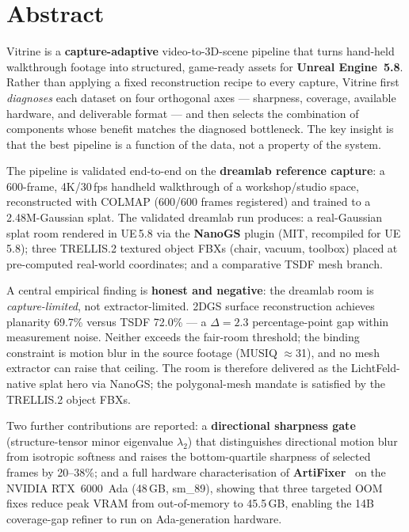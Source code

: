 \documentclass[a4paper,11pt]{report}
\begin{document}

\chapter*{Abstract}

Vitrine is a \textbf{capture-adaptive} video-to-3D-scene pipeline that turns
hand-held walkthrough footage into structured, game-ready assets for
\textbf{Unreal Engine~5.8}.  Rather than applying a fixed reconstruction recipe
to every capture, Vitrine first \emph{diagnoses} each dataset on four
orthogonal axes --- sharpness, coverage, available hardware, and deliverable
format --- and then selects the combination of components whose benefit matches
the diagnosed bottleneck.  The key insight is that the best pipeline is a
function of the data, not a property of the system.

The pipeline is validated end-to-end on the \textbf{dreamlab reference capture}:
a 600-frame, 4K/30\,fps handheld walkthrough of a workshop/studio space,
reconstructed with COLMAP (600/600 frames registered) and trained to a
2.48M-Gaussian splat.  The validated dreamlab run produces: a real-Gaussian splat
room rendered in UE\,5.8 via the \textbf{NanoGS} plugin (MIT, recompiled for
UE\,5.8); three TRELLIS.2 textured object FBXs (chair, vacuum, toolbox) placed at
pre-computed real-world coordinates; and a comparative TSDF mesh branch.

A central empirical finding is \textbf{honest and negative}: the dreamlab room is
\emph{capture-limited}, not extractor-limited.  2DGS surface reconstruction
achieves planarity 69.7\% versus TSDF 72.0\% --- a $\Delta=2.3$ percentage-point
gap within measurement noise.  Neither exceeds the fair-room threshold; the binding
constraint is motion blur in the source footage (MUSIQ $\approx$31), and no mesh
extractor can raise that ceiling.  The room is therefore delivered as the
LichtFeld-native splat hero via NanoGS; the polygonal-mesh mandate is satisfied by
the TRELLIS.2 object FBXs.

Two further contributions are reported: a \textbf{directional sharpness gate}
(structure-tensor minor eigenvalue $\lambda_2$) that distinguishes directional
motion blur from isotropic softness and raises the bottom-quartile sharpness of
selected frames by 20--38\%; and a full hardware characterisation of
\textbf{ArtiFixer}~\cite{delutio2026_artifixer} on the NVIDIA RTX~6000~Ada
(48\,GB, sm\_89), showing that three targeted OOM fixes reduce peak VRAM from
out-of-memory to 45.5\,GB, enabling the 14B coverage-gap refiner to run on
Ada-generation hardware.
\end{document}

